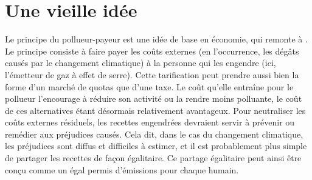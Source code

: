 \documentclass[a5paper,french]{memoir}
\begin{document}
\section{Une vieille idée}

Le principe du pollueur-payeur est une idée de base en économie, qui remonte à \citet{pigou_economics_1920}. Le principe consiste à faire payer les coûts externes (en l'occurrence, les dégâts causés par le changement climatique) à la personne qui les engendre (ici, l'émetteur de gaz à effet de serre). Cette tarification peut prendre aussi bien la forme d'un marché de quotas que d'une taxe. Le coût qu'elle entraîne pour le pollueur l'encourage à réduire son activité ou la rendre moins polluante, le coût de ces alternatives étant désormais relativement avantageux. Pour neutraliser les coûts externes résiduels, les recettes engendrées devraient servir à prévenir ou remédier aux préjudices causés. Cela dit, dans le cas du changement climatique, les préjudices sont diffus et difficiles à estimer, et il est probablement plus simple de partager les recettes de façon égalitaire. Ce partage égalitaire peut ainsi être conçu comme un égal permis d'émissions pour chaque humain. 
\end{document}
